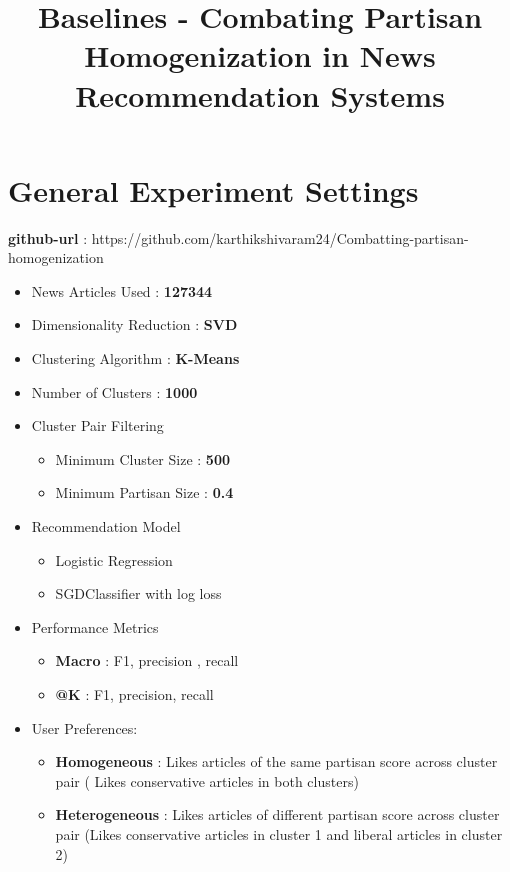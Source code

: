 \documentclass[a4paper,fontsize=9.0pt]{scrartcl}
\title{\textbf{Baselines - Combating Partisan Homogenization in News Recommendation Systems}}
\date{\vspace{-10ex}}
\begin{document}
\maketitle

\section{General Experiment Settings}
\textbf{github-url} : https://github.com/karthikshivaram24/Combatting-partisan-homogenization
\begin{flushleft}
\begin{itemize}
  \item News Articles Used : \textbf{127344}
  \item Dimensionality Reduction : \textbf{SVD}
  \item Clustering Algorithm : \textbf{K-Means}
  \item Number of Clusters : \textbf{1000}
  \item Cluster Pair Filtering 
  \begin{itemize}
      \item Minimum Cluster Size : \textbf{500}
      \item Minimum Partisan Size : \textbf{0.4}
  \end{itemize}
  \item Recommendation Model
  \begin{itemize}
      \item Logistic Regression
      \item SGDClassifier with log loss
  \end{itemize}
  \item Performance Metrics
  \begin{itemize}
      \item \textbf{Macro} : F1, precision , recall
      \item \textbf{@K} : F1, precision, recall
  \end{itemize}
  \item User Preferences:
  \begin{itemize}
      \item \textbf{Homogeneous} : Likes articles of the same partisan score across cluster pair ( Likes conservative articles in both clusters)
      \item \textbf{Heterogeneous} : Likes articles of different partisan score across cluster pair (Likes conservative articles in cluster 1 and liberal articles in cluster 2)
  \end{itemize}

\end{itemize}
\end{flushleft}
\end{document}
